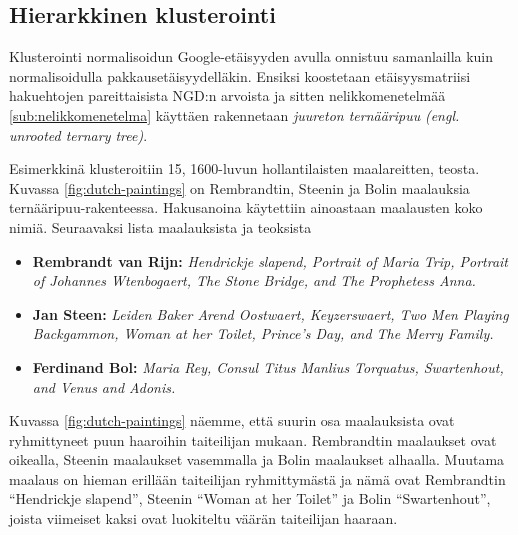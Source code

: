 \documentclass[12pt,finnish]{tktltiki2}
\theoremstyle{definition}
\theoremstyle{remark}
\newcommand{\engl}[1]{\emph{(engl. #1)}}
\begin{document}
    \subsection{Hierarkkinen klusterointi} %
    \label{sub:klusterointi}
      Klusterointi normalisoidun Google-etäisyyden avulla onnistuu samanlailla kuin normalisoidulla pakkausetäisyydelläkin. Ensiksi koostetaan etäisyysmatriisi hakuehtojen pareittaisista NGD:n arvoista ja sitten nelikkomenetelmää \ref{sub:nelikkomenetelma} käyttäen rakennetaan \emph{juureton ternääripuu} \engl{unrooted ternary tree}.

      Esimerkkinä klusteroitiin 15, 1600-luvun hollantilaisten maalareitten, teosta.
      Kuvassa \ref{fig:dutch-paintings} on Rembrandtin, Steenin ja Bolin maalauksia ternääripuu-rakenteessa.
      Hakusanoina käytettiin ainoastaan maalausten koko nimiä. Seuraavaksi lista maalauksista ja teoksista

      \begin{itemize}
        \item \textbf{Rembrandt van Rijn:} \emph{Hendrickje slapend, Portrait of Maria Trip, Portrait of Johannes Wtenbogaert, The Stone Bridge, and The Prophetess Anna.}
        \item \textbf{Jan Steen:} \emph{Leiden Baker Arend Oostwaert, Keyzerswaert, Two Men Playing Backgammon, Woman at her Toilet, Prince’s Day, and The Merry Family.}
        \item \textbf{Ferdinand Bol:} \emph{Maria Rey, Consul Titus Manlius Torquatus, Swartenhout, and Venus and Adonis.}
      \end{itemize}

      Kuvassa \ref{fig:dutch-paintings} näemme, että suurin osa maalauksista ovat ryhmittyneet puun haaroihin taiteilijan mukaan. Rembrandtin maalaukset ovat oikealla, Steenin maalaukset vasemmalla ja Bolin maalaukset alhaalla. Muutama maalaus on hieman erillään taiteilijan ryhmittymästä ja nämä ovat Rembrandtin ``Hendrickje slapend'', Steenin ``Woman at her Toilet'' ja  Bolin ``Swartenhout'', joista viimeiset kaksi ovat luokiteltu väärän taiteilijan haaraan.
\end{document}
